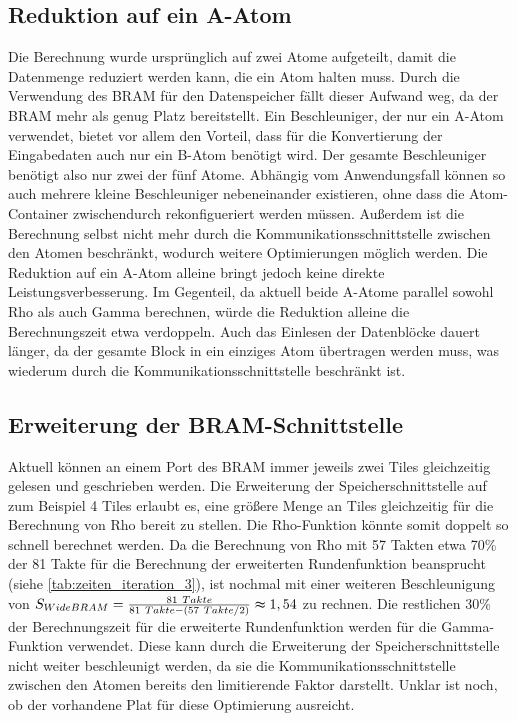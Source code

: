 \subsection{Reduktion auf ein A-Atom}
Die Berechnung wurde ursprünglich auf zwei Atome aufgeteilt, damit die Datenmenge reduziert werden kann, die ein Atom halten muss.
Durch die Verwendung des BRAM für den Datenspeicher fällt dieser Aufwand weg, da der BRAM mehr als genug Platz bereitstellt.
Ein Beschleuniger, der nur ein A-Atom verwendet, bietet vor allem den Vorteil, dass für die Konvertierung der Eingabedaten auch nur ein B-Atom benötigt wird.
Der gesamte Beschleuniger benötigt also nur zwei der fünf Atome. Abhängig vom Anwendungsfall können so auch mehrere kleine Beschleuniger nebeneinander existieren,
ohne dass die Atom-Container zwischendurch rekonfigueriert werden müssen.
Außerdem ist die Berechnung selbst nicht mehr durch die Kommunikationsschnittstelle zwischen den Atomen beschränkt, wodurch weitere Optimierungen möglich werden.
Die Reduktion auf ein A-Atom alleine bringt jedoch keine direkte Leistungsverbesserung. Im Gegenteil, da aktuell beide A-Atome parallel sowohl Rho als auch Gamma berechnen,
würde die Reduktion alleine die Berechnungszeit etwa verdoppeln. Auch das Einlesen der Datenblöcke dauert länger, da der gesamte Block in ein einziges Atom übertragen werden muss,
was wiederum durch die Kommunikationsschnittstelle beschränkt ist. 

\subsection{Erweiterung der BRAM-Schnittstelle}
Aktuell können an einem Port des BRAM immer jeweils zwei Tiles gleichzeitig gelesen und geschrieben werden.
Die Erweiterung der Speicherschnittstelle auf zum Beispiel 4 Tiles erlaubt es,
eine größere Menge an Tiles gleichzeitig für die Berechnung von Rho bereit zu stellen.
Die Rho-Funktion könnte somit doppelt so schnell berechnet werden. Da die Berechnung von Rho mit 57 Takten
etwa 70\% der 81 Takte für die Berechnung der erweiterten Rundenfunktion beansprucht (siehe \ref{tab:zeiten_iteration_3}),
ist nochmal mit einer weiteren Beschleunigung von $S_{WideBRAM} = \frac{81\ Takte}{81\ Takte - (57\ Takte / 2)} \thickapprox 1,54$ zu rechnen.
Die restlichen 30\% der Berechnungszeit für die erweiterte Rundenfunktion werden für die Gamma-Funktion verwendet.
Diese kann durch die Erweiterung der Speicherschnittstelle nicht weiter beschleunigt werden,
da sie die Kommunikationsschnittstelle zwischen den Atomen bereits den limitierende Faktor darstellt.
Unklar ist noch, ob der vorhandene Plat für diese Optimierung ausreicht.

